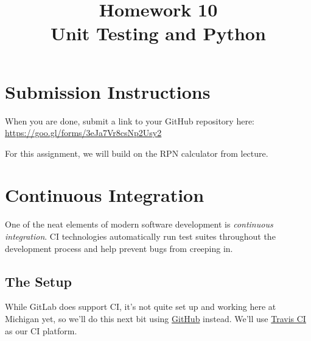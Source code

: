 \documentclass{article}
\begin{document}
\fancyhead[C]{}
\fancyhead[L]{}
\fancyhead[R]{}

\fancyfoot[C]{\color{gray} \thepage~/~\pageref*{LastPage}}
\pagestyle{fancyplain}


\title{\textbf{Homework 10\\Unit Testing and Python}}
\author{\textbf{\color{red}{Due: Saturday, March 18, 10:00PM (Hard Deadline)}}}
\date{}
\maketitle

\section*{Submission Instructions}
When you are done, submit a link to your GitHub repository here: \url{https://goo.gl/forms/3eJa7Vr8csNp2Usy2}

\bigskip

\begin{mdframed}\centering
For this assignment, we will build on the RPN calculator from lecture.
\end{mdframed}



\section{Continuous Integration}
One of the neat elements of modern software development is \emph{continuous
  integration}. CI technologies automatically run test suites throughout the
development process and help prevent bugs from creeping in.

\subsection{The Setup}

While GitLab does support CI, it's not quite set up and working here at
Michigan yet, so we'll do this next bit using
\href{https://github.com}{GitHub} instead.
We'll use \href{https://travis-ci.org/}{Travis CI} as our CI platform.
\end{document}
